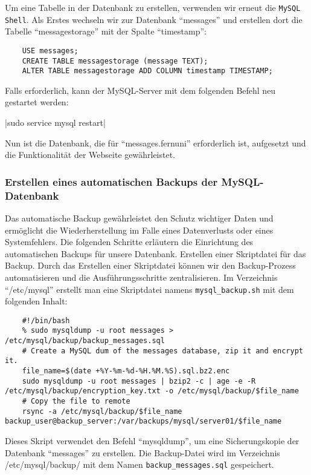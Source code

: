 Um eine Tabelle in der Datenbank zu erstellen, verwenden wir erneut die \verb+MySQL Shell+.
Als Erstes wechseln wir zur Datenbank \enquote{messages} und erstellen dort die Tabelle \enquote{messagestorage} mit der Spalte \enquote{timestamp}:

\begin{verbatim}
    USE messages;
    CREATE TABLE messagestorage (message TEXT);
    ALTER TABLE messagestorage ADD COLUMN timestamp TIMESTAMP;
\end{verbatim}

Falls erforderlich, kann der MySQL-Server mit dem folgenden Befehl neu gestartet werden:

|sudo service mysql restart|

Nun ist die Datenbank, die für \enquote{messages.fernuni} erforderlich ist, aufgesetzt und die Funktionalität der Webseite gewährleistet.

\subsubsection*{Erstellen eines automatischen Backups der MySQL-Datenbank}

Das automatische Backup gewährleistet den Schutz wichtiger Daten und ermöglicht die Wiederherstellung im Falle eines Datenverlusts oder eines Systemfehlers. Die folgenden Schritte erläutern die Einrichtung des automatischen Backups für unsere Datenbank.
Erstellen einer Skriptdatei für das Backup.
Durch das Erstellen einer Skriptdatei können wir den Backup-Prozess automatisieren und die Ausführungsschritte zentralisieren.
Im Verzeichnis \enquote{/etc/mysql} erstellt man eine Skriptdatei namens \verb+mysql_backup.sh+ mit dem folgenden Inhalt:

\begin{verbatim}
    #!/bin/bash
    % sudo mysqldump -u root messages > /etc/mysql/backup/backup_messages.sql
    # Create a MySQL dum of the messages database, zip it and encrypt it.
    file_name=$(date +%Y-%m-%d-%H.%M.%S).sql.bz2.enc
    sudo mysqldump -u root messages | bzip2 -c | age -e -R /etc/mysql/backup/encryption_key.txt -o /etc/mysql/backup/$file_name
    # Copy the file to remote
    rsync -a /etc/mysql/backup/$file_name backup_user@backup_server:/var/backups/mysql/server01/$file_name
\end{verbatim}

Dieses Skript verwendet den Befehl \enquote{mysqldump}, um eine Sicherungskopie der Datenbank \enquote{messages} zu erstellen. 
Die Backup-Datei wird im Verzeichnis /etc/mysql/backup/ mit dem Namen \verb+backup_messages.sql+ gespeichert.

